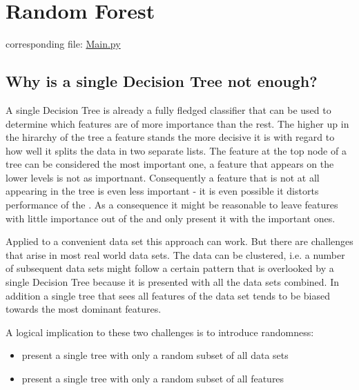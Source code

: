 \documentclass[letterpaper,10pt,english]{sphinxmanual}
\begin{document}
\section{Random Forest}
\label{\detokenize{RF:random-forest}}\label{\detokenize{RF::doc}}\label{\detokenize{RF:id1}}
corresponding file: \href{https://github.com/weinertmos/ForestFire/blob/master/source/ForestFire/Main.py}{Main.py}


\subsection{Why is a single Decision Tree not enough?}
\label{\detokenize{RF:why-is-a-single-decision-tree-not-enough}}
A single Decision Tree is already a fully fledged classifier that can be used to determine which features are of more importance than the rest.
The higher up in the hirarchy of the tree a feature stands the more decisive it is with regard to how well it splits the data in two separate lists.
The feature at the top node of a tree can be considered the most important one, a feature that appears on the lower levels is not as importnant.
Consequently a feature that is not at all appearing in the tree is even less important - it is even possible it distorts performance of the {\hyperref[\detokenize{Overview:mla}]{}}.
As a consequence it might be reasonable to leave features with little importance out of the {\hyperref[\detokenize{Overview:mla}]{}} and only present it with the important ones.

Applied to a convenient data set this approach can work.
But there are challenges that arise in most real world data sets.
The data can be clustered, i.e. a number of subsequent data sets might follow a certain pattern that is overlooked by a single Decision Tree because it is presented with all the data sets combined.
In addition a single tree that sees all features of the data set tends to be biased towards the most dominant features.

A logical implication to these two challenges is to introduce randomness:
\begin{itemize}
\item {} 
present a single tree with only a random subset of all data sets

\item {} 
present a single tree with only a random subset of all features

\end{itemize}
\end{document}
